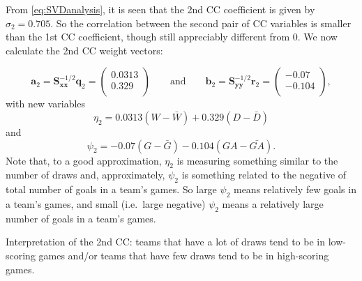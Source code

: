 \documentclass[
]{book}
\newenvironment{Shaded}{\begin{snugshade}}{\end{snugshade}}
\newcommand{\AttributeTok}[1]{\textcolor[rgb]{0.13,0.29,0.53}{#1}}
\newcommand{\DecValTok}[1]{\textcolor[rgb]{0.00,0.00,0.81}{#1}}
\newcommand{\FunctionTok}[1]{\textcolor[rgb]{0.13,0.29,0.53}{\textbf{#1}}}
\newcommand{\NormalTok}[1]{#1}
\newcommand{\OtherTok}[1]{\textcolor[rgb]{0.56,0.35,0.01}{#1}}
\newcommand{\SpecialCharTok}[1]{\textcolor[rgb]{0.81,0.36,0.00}{\textbf{#1}}}
\theoremstyle{definition}
\theoremstyle{definition}
\theoremstyle{definition}
\theoremstyle{definition}
\theoremstyle{remark}
\begin{document}
From \eqref{eq:SVDanalysis}, it is seen that the 2nd CC coefficient is given by \(\sigma_2=0.705\). So the correlation between the second pair of CC variables is smaller than the 1st CC coefficient, though still appreciably different from \(0\). We now calculate the 2nd CC weight vectors:

\[
\mathbf a_2=\mathbf S_{\mathbf x\mathbf x}^{-1/2} \mathbf q_2 = \begin{pmatrix}0.0313 \\0.329 \\\end{pmatrix}
\qquad \text{and} \qquad
\mathbf b_2=\mathbf S_{\mathbf y\mathbf y}^{-1/2}\mathbf r_2=\begin{pmatrix}-0.07 \\-0.104 \\\end{pmatrix},
\]
with
new variables
\[
\eta_2 =0.0313 (W-\bar{W}) +0.329(D -\bar{D})
\]
and
\[
 \psi_2 = -0.07(G-\bar{G}) -0.104(GA-\bar{GA}).
\]
Note that, to a good approximation, \(\eta_2\) is measuring something similar to the number of draws and, approximately, \(\psi_2\) is something related to the negative of total number of goals in a team's games. So large \(\psi_2\) means relatively few goals in a team's games, and small (i.e.~large negative) \(\psi_2\) means a relatively large number of goals in a team's games.

Interpretation of the 2nd CC: teams that have a lot of draws tend to be in low-scoring games and/or teams that have few draws tend to be in high-scoring games.

\begin{Shaded}
\end{Shaded}
\end{document}
